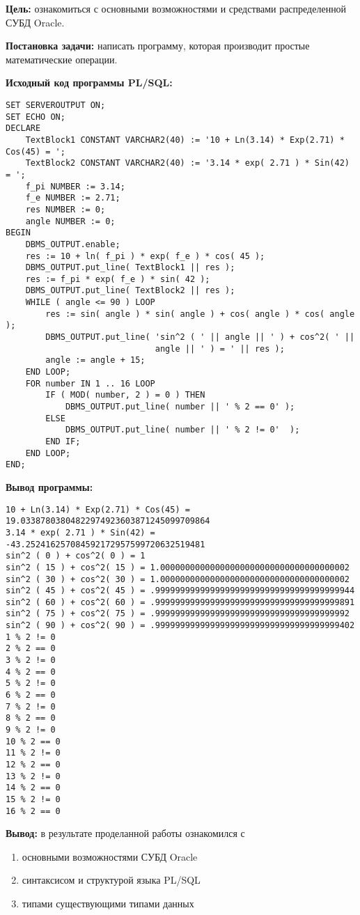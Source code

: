 \documentclass[pscyr, 12pt]{hedlab}
\begin{document}
    \makeheader
    \textbf{Цель:} ознакомиться с основными возможностями и средствами распределенной СУБД Oracle.

    \textbf{Постановка задачи:} написать программу, которая производит простые математические 
    операции.
  
    \textbf{Исходный код программы PL/SQL:}
    \begin{lstlisting}
SET SERVEROUTPUT ON;
SET ECHO ON;
DECLARE
    TextBlock1 CONSTANT VARCHAR2(40) := '10 + Ln(3.14) * Exp(2.71) * Cos(45) = ';
    TextBlock2 CONSTANT VARCHAR2(40) := '3.14 * exp( 2.71 ) * Sin(42) = ';
    f_pi NUMBER := 3.14;
    f_e NUMBER := 2.71;
    res NUMBER := 0;
    angle NUMBER := 0;
BEGIN
    DBMS_OUTPUT.enable;
    res := 10 + ln( f_pi ) * exp( f_e ) * cos( 45 );
    DBMS_OUTPUT.put_line( TextBlock1 || res );
    res := f_pi * exp( f_e ) * sin( 42 );
    DBMS_OUTPUT.put_line( TextBlock2 || res );
    WHILE ( angle <= 90 ) LOOP
        res := sin( angle ) * sin( angle ) + cos( angle ) * cos( angle );
        DBMS_OUTPUT.put_line( 'sin^2 ( ' || angle || ' ) + cos^2( ' || 
                              angle || ' ) = ' || res );
        angle := angle + 15;
    END LOOP;
    FOR number IN 1 .. 16 LOOP
        IF ( MOD( number, 2 ) = 0 ) THEN
            DBMS_OUTPUT.put_line( number || ' % 2 == 0' );
        ELSE
            DBMS_OUTPUT.put_line( number || ' % 2 != 0'  );
        END IF;
    END LOOP;
END;
    \end{lstlisting}

    \newpage

    \textbf{Вывод программы:}
    \begin{lstlisting}
10 + Ln(3.14) * Exp(2.71) * Cos(45) = 19.03387803804822974923603871245099709864
3.14 * exp( 2.71 ) * Sin(42) = -43.252416257084592172957599720632519481
sin^2 ( 0 ) + cos^2( 0 ) = 1
sin^2 ( 15 ) + cos^2( 15 ) = 1.00000000000000000000000000000000000002
sin^2 ( 30 ) + cos^2( 30 ) = 1.00000000000000000000000000000000000002
sin^2 ( 45 ) + cos^2( 45 ) = .9999999999999999999999999999999999999944
sin^2 ( 60 ) + cos^2( 60 ) = .9999999999999999999999999999999999999891
sin^2 ( 75 ) + cos^2( 75 ) = .999999999999999999999999999999999999992
sin^2 ( 90 ) + cos^2( 90 ) = .9999999999999999999999999999999999999402
1 % 2 != 0
2 % 2 == 0
3 % 2 != 0
4 % 2 == 0
5 % 2 != 0
6 % 2 == 0
7 % 2 != 0
8 % 2 == 0
9 % 2 != 0
10 % 2 == 0
11 % 2 != 0
12 % 2 == 0
13 % 2 != 0
14 % 2 == 0
15 % 2 != 0
16 % 2 == 0
    \end{lstlisting}

    \textbf{Вывод:} в результате проделанной работы ознакомился с
    \begin{enumerate}\itemsep-5pt
        \item основными возможностями СУБД Oracle
        \item синтаксисом и структурой языка PL/SQL
        \item типами существующими типами данных
    \end{enumerate}
\end{document}
